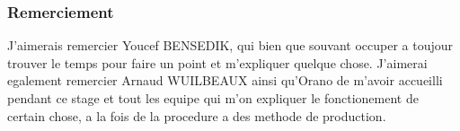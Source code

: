 

\begin{center}

    \subsubsection*{Remerciement}
J'aimerais remercier Youcef BENSEDIK, qui bien que souvant occuper a toujour trouver le temps pour faire un point et m'expliquer quelque chose. J'aimerai egalement remercier Arnaud WUILBEAUX ainsi qu’Orano  de m'avoir accueilli pendant ce stage et tout les equipe qui m'on expliquer le fonctionement de certain chose, a la fois de la procedure a des methode de production.
\end{center}


\begin{abstract}
    \lipsum[1]
\end{abstract}
    

\begin{adjustwidth}{30pt}{30pt}
\end{adjustwidth}

\tableofcontents
\listoffigures
\clearpage